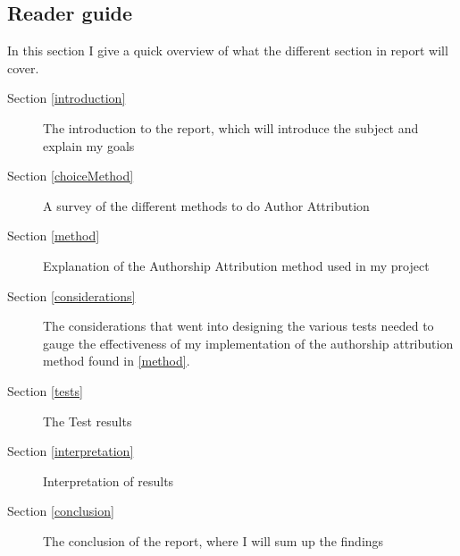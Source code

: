 \subsection{Reader guide}
In this section I give a quick overview of what the different section in report will cover.
\begin{description}
\item[Section \ref{introduction}] The introduction to the report, which will introduce the subject and explain my goals
\item[Section \ref{choiceMethod}] A survey of the different methods to do Author Attribution  
\item[Section \ref{method}] Explanation of the Authorship Attribution method used in my project
\item[Section \ref{considerations}] The considerations that went into designing the various tests needed to gauge the effectiveness of my implementation of the authorship attribution method found in \ref{method}.
\item[Section \ref{tests}] The Test results
\item[Section \ref{interpretation}] Interpretation of results
\item[Section \ref{conclusion}] The conclusion of the report, where I will sum up the findings  
\end{description}

